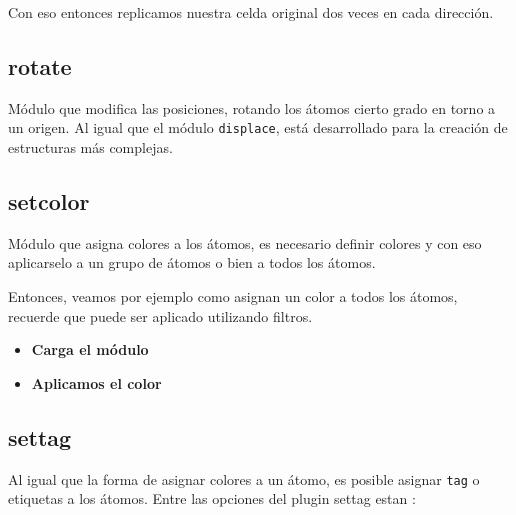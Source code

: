 Con eso entonces replicamos nuestra celda original dos veces en cada direcci\'on.


\subsection{rotate}
M\'odulo que modifica las posiciones, rotando los \'atomos cierto grado en torno a un origen. Al igual que el m\'odulo \verb|displace|, est\'a desarrollado para la creaci\'on de estructuras m\'as complejas.


\subsection{setcolor}
M\'odulo que asigna colores a los \'atomos, es necesario definir colores y con eso aplicarselo a un grupo de \'atomos o bien a todos los \'atomos. 


Entonces, veamos por ejemplo como asignan un color a todos los \'atomos, recuerde que puede ser aplicado utilizando filtros.

\begin{itemize}
 \item \textbf{Carga el m\'odulo}
 \item \textbf{Aplicamos el color}
\end{itemize}

\subsection{settag}
Al igual que la forma de asignar colores a un \'atomo, es posible asignar \verb|tag| o etiquetas a los \'atomos. Entre las opciones del plugin settag estan :

